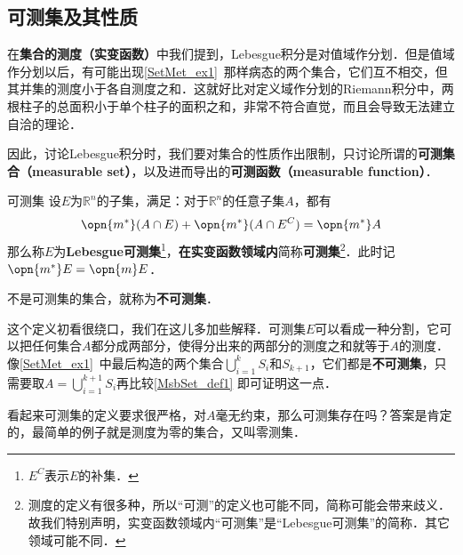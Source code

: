 

\subsection{可测集及其性质}

在\textbf{集合的测度（实变函数）}中我们提到，Lebesgue积分是对值域作分划．但是值域作分划以后，有可能出现\autoref{SetMet_ex1}~那样病态的两个集合，它们互不相交，但其并集的测度小于各自测度之和．这就好比对定义域作分划的Riemann积分中，两根柱子的总面积小于单个柱子的面积之和，非常不符合直觉，而且会导致无法建立自洽的理论．

因此，讨论Lebesgue积分时，我们要对集合的性质作出限制，只讨论所谓的\textbf{可测集合（measurable set）}，以及进而导出的\textbf{可测函数（measurable function）}．

\begin{definition}{可测集}\label{MsbSet_def1}
设$E$为$\mathbb{R}^n$的子集，满足：对于$\mathbb{R}^n$的任意子集$A$，都有
\begin{equation}
\opn{m^*}(A\cap E)+\opn{m^*}(A\cap E^C)=\opn{m^*}A
\end{equation}
那么称$E$为\textbf{Lebesgue可测集}\footnote{$E^C$表示$E$的补集．}，\textbf{在实变函数领域内}简称\textbf{可测集}\footnote{测度的定义有很多种，所以“可测”的定义也可能不同，简称可能会带来歧义．故我们特别声明，实变函数领域内“可测集”是“Lebesgue可测集”的简称．其它领域可能不同．}．此时记$\opn{m^*}E=\opn{m}E$．

不是可测集的集合，就称为\textbf{不可测集}．

\end{definition}

这个定义初看很绕口，我们在这儿多加些解释．可测集$E$可以看成一种分割，它可以把任何集合$A$都分成两部分，使得分出来的两部分的测度之和就等于$A$的测度．像\autoref{SetMet_ex1}~中最后构造的两个集合$\bigcup_{i=1}^k S_i$和$S_{k+1}$，它们都是\textbf{不可测集}，只需要取$A=\bigcup^{k+1}_{i=1} S_i$再比较\autoref{MsbSet_def1} 即可证明这一点．

看起来可测集的定义要求很严格，对$A$毫无约束，那么可测集存在吗？答案是肯定的，最简单的例子就是测度为零的集合，又叫零测集．

